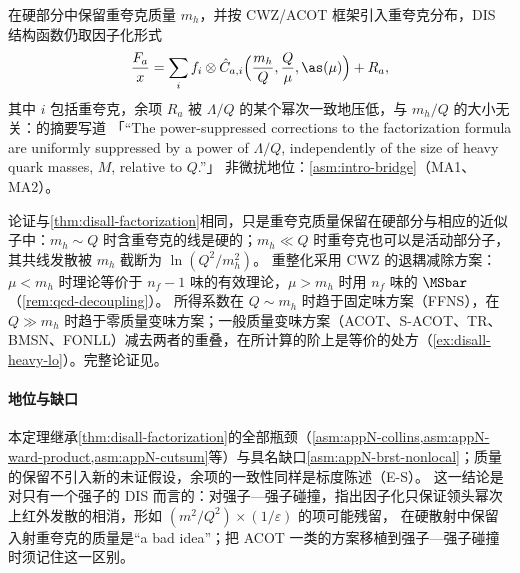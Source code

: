 \begin{theorem}\label{thm:disall-heavy}
在硬部分中保留重夸克质量 $m_h$，并按 CWZ/ACOT 框架引入重夸克分布\cite{CollinsWilczekZee1978,AivazisEtAl1994}，DIS 结构函数仍取因子化形式
\begin{equation}\label{eq:disall-heavy}
\frac{F_a}{x}=\sum_i f_i\otimes\hat C_{a,i}\Big(\frac{m_h}Q,\frac Q\mu,\as(\mu)\Big)+R_a,
\end{equation}
其中 $i$ 包括重夸克，余项 $R_a$ 被 $\Lambda/Q$ 的某个幂次一致地压低，与 $m_h/Q$ 的大小无关：\cite{Collins1998b}的摘要写道
「“The power-suppressed corrections to the factorization formula are uniformly suppressed by a power of $\Lambda/Q$, independently of the size of heavy quark masses, $M$, relative to $Q$.”」
非微扰地位：\cref{asm:intro-bridge}（MA1、MA2）。
\end{theorem}

\begin{proofsketch}
论证与\cref{thm:disall-factorization}相同，只是重夸克质量保留在硬部分与相应的近似子中：$m_h\sim Q$ 时含重夸克的线是硬的；$m_h\ll Q$ 时重夸克也可以是活动部分子，其共线发散被 $m_h$ 截断为 $\ln(Q^2/m_h^2)$。
重整化采用 CWZ 的退耦减除方案\cite{CollinsWilczekZee1978}：$\mu<m_h$ 时理论等价于 $n_f-1$ 味的有效理论，$\mu>m_h$ 时用 $n_f$ 味的 $\MSbar$（\cref{rem:qcd-decoupling}）。
所得系数在 $Q\sim m_h$ 时趋于固定味方案（FFNS），在 $Q\gg m_h$ 时趋于零质量变味方案；一般质量变味方案（ACOT\cite{Aivazis:1993kh,AivazisEtAl1994}、S-ACOT\cite{Kramer:2000hn}、TR\cite{Thorne:1997ga}、
BMSN\cite{Buza:1996wv}、FONLL\cite{Forte:2010ta}）减去两者的重叠，在所计算的阶上是等价的处方（\cref{ex:disall-heavy-lo}）。完整论证见\cite{Collins1998b}。
\end{proofsketch}

\paragraph{地位与缺口}
本定理继承\cref{thm:disall-factorization}的全部瓶颈（\cref{asm:appN-collins,asm:appN-ward-product,asm:appN-cutsum}等）与具名缺口\cref{asm:appN-brst-nonlocal}；质量的保留不引入新的未证假设，余项的一致性同样是标度陈述（E-S）。
这一结论是对只有一个强子的 DIS 而言的：对强子—强子碰撞，\cite[第~14.6~节，第~569--570~页]{Collins2011}指出因子化只保证领头幂次上红外发散的相消，形如 $(m^2/Q^2)\times(1/\varepsilon)$ 的项可能残留，
在硬散射中保留入射重夸克的质量是“a bad idea”；把 ACOT 一类的方案移植到强子—强子碰撞时须记住这一区别。

